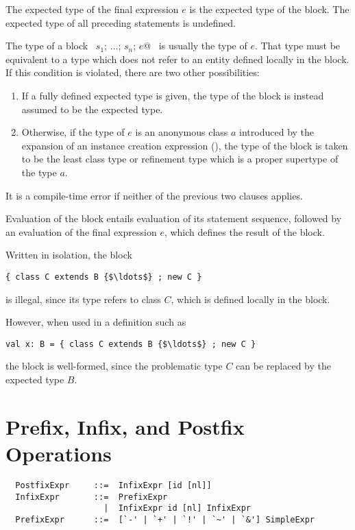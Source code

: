 
The expected type of the final expression $e$ is the expected
type of the block. The expected type of all preceding statements is
undefined.

The type of a block ~\lstinline@$s_1$; $\ldots$; $s_n$; $e$@~ is
usually the type of $e$.  That type must be equivalent to a type which
does not refer to an entity defined locally in the block. If this
condition is violated, there are two other possibilities:
\begin{enumerate}
\item
If a fully defined expected type is given, the
type of the block is instead assumed to be the expected type.
\item 
Otherwise, if the type of $e$ is an anonymous class $a$ introduced by the
expansion of an instance creation expression
(), the type of the block is taken to be the 
least class type or refinement type which is a proper supertype of the type $a$.
\end{enumerate}
It is a compile-time error if neither of the previous two clauses applies.

Evaluation of the block entails evaluation of its
statement sequence, followed by an evaluation of the final expression
$e$, which defines the result of the block.

\example
Written in isolation, 
the block 
\begin{lstlisting}
{ class C extends B {$\ldots$} ; new C }
\end{lstlisting}
is illegal, since its type
refers to class $C$, which is defined locally in the block.

However, when used in a definition such as 
\begin{lstlisting}
val x: B = { class C extends B {$\ldots$} ; new C }
\end{lstlisting}
the block is well-formed, since the problematic type $C$ can be
replaced by the expected type $B$.

\section{Prefix, Infix, and Postfix Operations}
\label{sec:infix-operations}

\syntax\begin{lstlisting}
  PostfixExpr     ::=  InfixExpr [id [nl]]
  InfixExpr       ::=  PrefixExpr
                    |  InfixExpr id [nl] InfixExpr
  PrefixExpr      ::=  [`-' | `+' | `!' | `~' | `&'] SimpleExpr 
\end{lstlisting}

